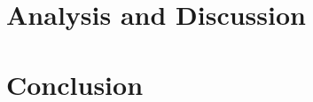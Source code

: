 \documentclass[12pt,a4paper]{article}
\newif\iffluff
\begin{document}

\iffluff


\pagebreak

\pagebreak
\fi

\begin{abstract}
\end{abstract}
\pagebreak

\tableofcontents %
\newpage

\iffluff
\listoftables
\newpage

\listoffigures
\newpage

\section*{Acknowledgements}
Insert acknowledgements here
\newpage
\fi


\pagebreak

\pagebreak

\pagebreak
\section{Analysis and Discussion}
\pagebreak
\section{Conclusion}
\pagebreak



\end{document}

